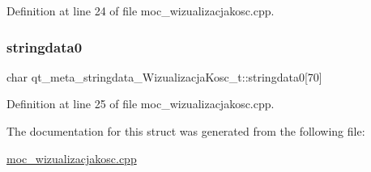 Definition at line 24 of file moc\+\_\+wizualizacjakosc.\+cpp.

\mbox{\label{structqt__meta__stringdata___wizualizacja_kosc__t_a1fbf183fef7c610db78772640aa60b1b}} 
\subsubsection{\texorpdfstring{stringdata0}{stringdata0}}
{\footnotesize\ttfamily char qt\+\_\+meta\+\_\+stringdata\+\_\+\+Wizualizacja\+Kosc\+\_\+t\+::stringdata0\mbox{[}70\mbox{]}}



Definition at line 25 of file moc\+\_\+wizualizacjakosc.\+cpp.



The documentation for this struct was generated from the following file\+:\begin{DoxyCompactItemize}
\item 
\hyperlink{moc__wizualizacjakosc_8cpp}{moc\+\_\+wizualizacjakosc.\+cpp}\end{DoxyCompactItemize}
